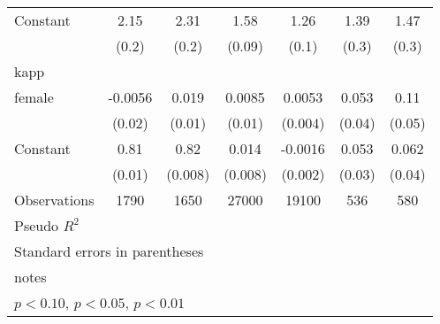 \begin{table}[htbp]
\begin{tabular}{l*{6}{c}}
\addlinespace
Constant            &        2.15\sym{***}&        2.31\sym{***}&        1.58\sym{***}&        1.26\sym{***}&        1.39\sym{***}&        1.47\sym{***}\\
                    &       (0.2)         &       (0.2)         &      (0.09)         &       (0.1)         &       (0.3)         &       (0.3)         \\
\midrule
kapp                &                     &                     &                     &                     &                     &                     \\
female              &     -0.0056         &       0.019\sym{*}  &      0.0085         &      0.0053         &       0.053         &        0.11\sym{**} \\
                    &      (0.02)         &      (0.01)         &      (0.01)         &     (0.004)         &      (0.04)         &      (0.05)         \\
\addlinespace
Constant            &        0.81\sym{***}&        0.82\sym{***}&       0.014\sym{*}  &     -0.0016         &       0.053\sym{*}  &       0.062         \\
                    &      (0.01)         &     (0.008)         &     (0.008)         &     (0.002)         &      (0.03)         &      (0.04)         \\
\midrule
Observations        &        1790         &        1650         &       27000         &       19100         &         536         &         580         \\
Pseudo \(R^{2}\)    &                     &                     &                     &                     &                     &                     \\
\bottomrule
\multicolumn{7}{l}{\footnotesize Standard errors in parentheses}\\
\multicolumn{7}{l}{\footnotesize notes}\\
\multicolumn{7}{l}{\footnotesize \sym{*} \(p<0.10\), \sym{**} \(p<0.05\), \sym{***} \(p<0.01\)}\\
\end{tabular}
\end{table}
